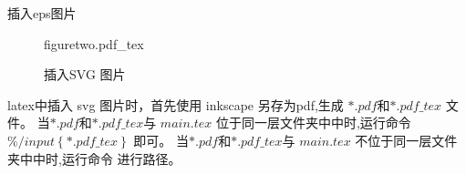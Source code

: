 插入eps图片

\begin{figure}[!h]
	\centering
	\def\svgscale{0.5}
	{figuretwo.pdf_tex} %
	\caption{插入SVG 图片}
\end{figure}

latex中插入 svg 图片时，首先使用 inkscape 另存为pdf,生成 $*.pdf$和$*.pdf\_tex$ 文件。
当$*.pdf$和$*.pdf\_tex$与 $main.tex$ 位于同一层文件夹中中时,运行命令
$  \%/input\left\{ *.pdf\_tex \right\} $ 即可。
当$*.pdf$和$*.pdf\_tex$与 $main.tex$ 不位于同一层文件夹中中时,运行命令 
进行路径。\\



